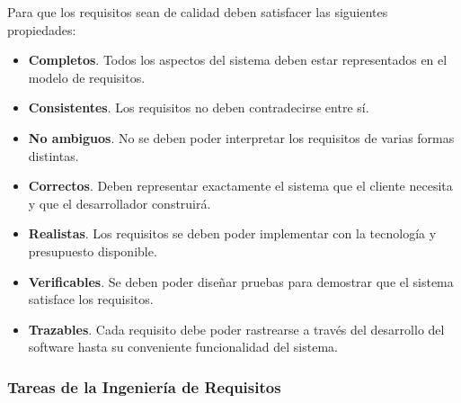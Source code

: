 \documentclass[12pt,spanish]{article}
\begin{document}
Para que los requisitos sean de calidad deben satisfacer las siguientes propiedades:

\begin{itemize}
	\item \textbf{Completos}. Todos los aspectos del sistema deben estar representados en el modelo de requisitos.
	\item \textbf{Consistentes}. Los requisitos no deben contradecirse entre sí.
	\item \textbf{No ambiguos}. No se deben poder interpretar los requisitos de varias formas distintas.
	\item \textbf{Correctos}. Deben representar exactamente el sistema que el cliente necesita y que el desarrollador construirá.
	\item \textbf{Realistas}. Los requisitos se deben poder implementar con la tecnología y presupuesto disponible.
	\item \textbf{Verificables}. Se deben poder diseñar pruebas para demostrar que el sistema satisface los requisitos.
	\item \textbf{Trazables}. Cada requisito debe poder rastrearse a través del desarrollo del software hasta su conveniente funcionalidad del sistema.
\end{itemize}


\subsubsection{Tareas de la Ingeniería de Requisitos}
\end{document}
